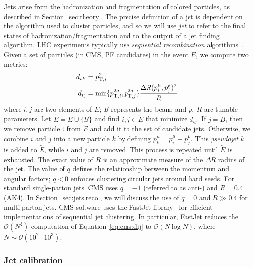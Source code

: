 Jets arise from the hadronization and fragmentation of colored particles, as described in Section~\ref{sec:theory}.
The precise definition of a jet is dependent on the algorithm used to cluster particles, and so we will use \emph{jet} to refer to the final states of hadronization/fragmentation and to the output of a jet finding algorithm.
LHC experiments typically use \emph{sequential recombination} algorithms~\cite{antikt,kt,ca}.
Given a set of particles (in CMS, PF candidates) in the event $E$, we compute two metrics:
\begin{align}
	d_{iB} &= p_{\mathrm{T},i}^2 \nonumber \\ 
	d_{ij} &= \min\{p_{\mathrm{T},i}^{2q}, p_{\mathrm{T},j}^{2q}\} \frac{\Delta R(p_i^\mu, p_j^\mu)^2}{R}
	\label{eq:cms:dij}
\end{align}
where $i,j$ are two elements of $E$; $B$ represents the beam; and $p,~R$ are tunable parameters.
Let $\tilde E = E \cup \{B\}$ and find $i,j\in \tilde E$ that minimize $d_{ij}$.
If $j=B$, then we remove particle $i$ from $\tilde E$ and add it to the set of candidate jets.
Otherwise, we combine $i$ and $j$ into a new particle $k$ by defining $p_k^\mu = p_i^\mu + p_j^\mu$.
This \emph{pseudojet} $k$ is added to $\tilde E$, while $i$ and $j$ are removed.
This process is repeated until $\tilde E$ is exhausted.
The exact value of $R$ is an approximate measure of the $\Delta R$ radius of the jet. 
The value of $q$ defines the relationship between the momentum and angular factors; $q<0$  enforces clustering circular jets around hard seeds.
For standard single-parton jets, CMS uses $q=-1$ (referred to as anti-\kt) and $R=0.4$ (AK4).
In Section~\ref{sec:jets:reco}, we will discuss the use of $q=0$ and $R\gg 0.4$ for multi-parton jets. 
CMS software uses the FastJet library~\cite{fastjet} for efficient implementations of sequential jet clustering.
In particular, FastJet reduces the $\mathcal{O}(N^2)$ computation of Equation~\ref{eq:cms:dij} to $\mathcal{O}(N\log N)$, where $N\sim\mathcal{O}(10^{2}\mathrm{-}10^3)$. 

\subsubsection{Jet calibration}

